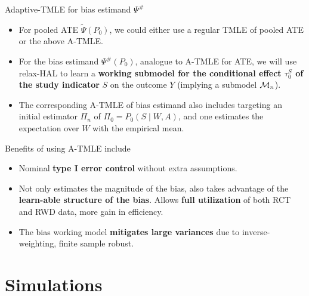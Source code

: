 \documentclass[t]{beamer}
\begin{document}
\begin{frame}{Adaptive-TMLE for bias estimand $\Psi^{\#}$}
\begin{itemize}
\item For pooled ATE $\tilde{\Psi}(P_0)$, we  could either use a regular TMLE of pooled ATE or the above A-TMLE.
\item For the bias estimand $\Psi^{\#}(P_0)$, analogue to A-TMLE for ATE,  we will use relax-HAL to learn a \textbf{working submodel for the conditional effect $\tau^S_0$ of the study indicator} $S$ on the outcome $Y$ (implying a submodel ${\cal M}_n$). 
\item The corresponding A-TMLE of bias estimand also includes targeting an initial estimator $\Pi_n$ of $\Pi_0=P_0(S\mid W,A)$, and one estimates the expectation over $W$ with the empirical mean. 
\end{itemize}
\end{frame}





\begin{frame}{Benefits of using A-TMLE include}
\begin{itemize}
\item Nominal \textbf{type I error control} without extra assumptions.
\item Not only estimates the magnitude of the bias, also takes advantage of the \textbf{learn-able structure of the bias}. Allows \textbf{full utilization} of both RCT and RWD data, more gain in efficiency.
\item The bias working model \textbf{mitigates large variances} due to inverse-weighting, finite sample robust.
\end{itemize}
\end{frame}

\section{Simulations}
\end{document}
